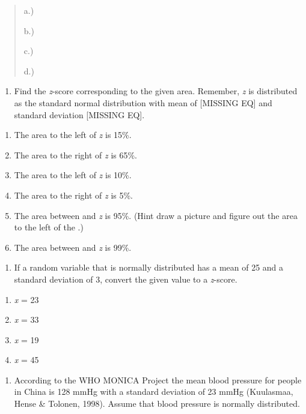 \documentclass[]{book}
\providecommand{\tightlist}{%
  \setlength{\itemsep}{0pt}\setlength{\parskip}{0pt}}
\begin{document}
\begin{quote}
a.)

b.)

c.)

d.)
\end{quote}

\begin{enumerate}
\def\labelenumi{\arabic{enumi}.}
\setcounter{enumi}{1}
\tightlist
\item
  Find the \emph{z}-score corresponding to the given area. Remember, \emph{z} is distributed as the standard normal distribution with mean of {[}MISSING EQ{]} and standard deviation {[}MISSING EQ{]}.
\end{enumerate}

\begin{enumerate}
\def\labelenumi{\alph{enumi}.}
\item
  The area to the left of \emph{z} is 15\%.
\item
  The area to the right of \emph{z} is 65\%.
\item
  The area to the left of \emph{z} is 10\%.
\item
  The area to the right of \emph{z} is 5\%.
\item
  The area between and \emph{z} is 95\%. (Hint draw a picture and figure out the area to the left of the .)
\item
  The area between and \emph{z} is 99\%.
\end{enumerate}

\begin{enumerate}
\def\labelenumi{\arabic{enumi}.}
\setcounter{enumi}{2}
\tightlist
\item
  If a random variable that is normally distributed has a mean of 25
  and a standard deviation of 3, convert the given value to a
  \emph{z}-score.
\end{enumerate}

\begin{enumerate}
\def\labelenumi{\alph{enumi}.}
\item
  \emph{x} = 23
\item
  \emph{x} = 33
\item
  \emph{x} = 19
\item
  \emph{x} = 45
\end{enumerate}

\begin{enumerate}
\def\labelenumi{\arabic{enumi}.}
\setcounter{enumi}{3}
\tightlist
\item
  According to the WHO MONICA Project the mean blood pressure for people in China is 128 mmHg with a standard deviation of 23 mmHg (Kuulasmaa, Hense \& Tolonen, 1998). Assume that blood pressure is normally distributed.
\end{enumerate}
\end{document}
